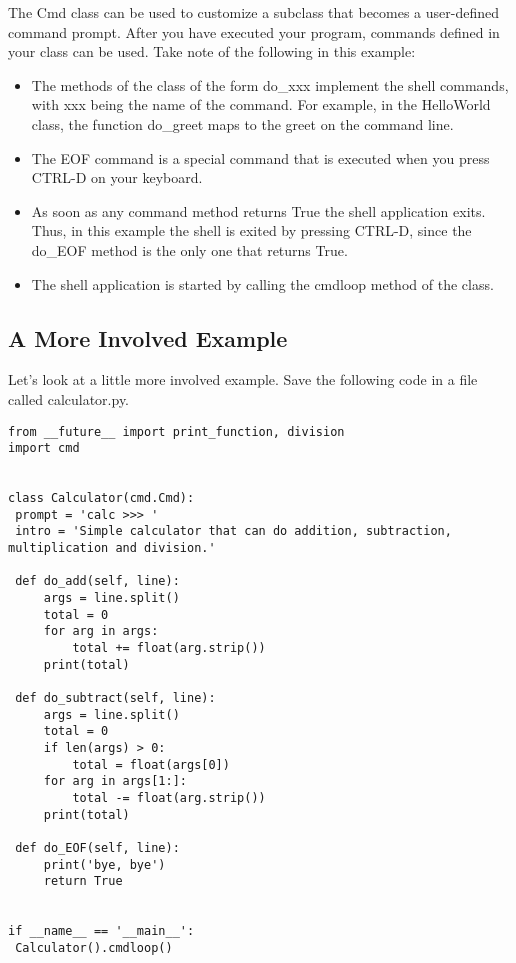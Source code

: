 The Cmd class can be used to customize a subclass that becomes a
user-defined command prompt. After you have executed your program,
commands defined in your class can be used. Take note of the following
in this example:

\begin{itemize}
\tightlist
\item
  The methods of the class of the form do\_xxx implement the shell
  commands, with xxx being the name of the command. For example, in the
  HelloWorld class, the function do\_greet maps to the greet on the
  command line.
\item
  The EOF command is a special command that is executed when you press
  CTRL-D on your keyboard.
\item
  As soon as any command method returns True the shell application
  exits. Thus, in this example the shell is exited by pressing CTRL-D,
  since the do\_EOF method is the only one that returns True.
\item
  The shell application is started by calling the cmdloop method of the
  class.
\end{itemize}

\subsection{A More Involved Example}\label{a-more-involved-example}

Let's look at a little more involved example. Save the following code in
a file called calculator.py.

\begin{lstlisting}
from __future__ import print_function, division
import cmd


class Calculator(cmd.Cmd):
 prompt = 'calc >>> '
 intro = 'Simple calculator that can do addition, subtraction, multiplication and division.'

 def do_add(self, line):
     args = line.split()
     total = 0
     for arg in args:
         total += float(arg.strip())
     print(total)

 def do_subtract(self, line):
     args = line.split()
     total = 0
     if len(args) > 0:
         total = float(args[0])
     for arg in args[1:]:
         total -= float(arg.strip())
     print(total)

 def do_EOF(self, line):
     print('bye, bye')
     return True


if __name__ == '__main__':
 Calculator().cmdloop()
\end{lstlisting}

